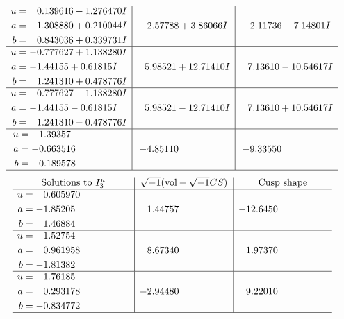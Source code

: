 \documentclass[1p]{elsarticle_modified}
\theoremstyle{definition}
\newcommand{\I}{\sqrt{-1}}
\begin{document}
$$\begin{array}{c|c|c}
\begin{aligned}
u &= \phantom{-}0.139616 - 1.276470 I \\
a &= -1.308880 + 0.210044 I \\
b &= \phantom{-}0.843036 + 0.339731 I\end{aligned}
 & \phantom{-}2.57788 + 3.86066 I & -2.11736 - 7.14801 I \\ \hline\begin{aligned}
u &= -0.777627 + 1.138280 I \\
a &= -1.44155 + 0.61815 I \\
b &= \phantom{-}1.241310 + 0.478776 I\end{aligned}
 & \phantom{-}5.98521 + 12.71410 I & \phantom{-}7.13610 - 10.54617 I \\ \hline\begin{aligned}
u &= -0.777627 - 1.138280 I \\
a &= -1.44155 - 0.61815 I \\
b &= \phantom{-}1.241310 - 0.478776 I\end{aligned}
 & \phantom{-}5.98521 - 12.71410 I & \phantom{-}7.13610 + 10.54617 I \\ \hline\begin{aligned}
u &= \phantom{-}1.39357\phantom{ +0.000000I} \\
a &= -0.663516\phantom{ +0.000000I} \\
b &= \phantom{-}0.189578\phantom{ +0.000000I}\end{aligned}
 & -4.85110\phantom{ +0.000000I} & -9.33550\phantom{ +0.000000I}\\
 \hline 
 \end{array}$$\newpage$$\begin{array}{c|c|c}  
\text{Solutions to }I^u_{3}& \I (\text{vol} + \sqrt{-1}CS) & \text{Cusp shape}\\
 \hline 
\begin{aligned}
u &= \phantom{-}0.605970\phantom{ +0.000000I} \\
a &= -1.85205\phantom{ +0.000000I} \\
b &= \phantom{-}1.46884\phantom{ +0.000000I}\end{aligned}
 & \phantom{-}1.44757\phantom{ +0.000000I} & -12.6450\phantom{ +0.000000I} \\ \hline\begin{aligned}
u &= -1.52754\phantom{ +0.000000I} \\
a &= \phantom{-}0.961958\phantom{ +0.000000I} \\
b &= -1.81382\phantom{ +0.000000I}\end{aligned}
 & \phantom{-}8.67340\phantom{ +0.000000I} & \phantom{-}1.97370\phantom{ +0.000000I} \\ \hline\begin{aligned}
u &= -1.76185\phantom{ +0.000000I} \\
a &= \phantom{-}0.293178\phantom{ +0.000000I} \\
b &= -0.834772\phantom{ +0.000000I}\end{aligned}
 & -2.94480\phantom{ +0.000000I} & \phantom{-}9.22010\phantom{ +0.000000I}\\
 \hline 
 \end{array}$$\newpage\newpage\renewcommand{\arraystretch}{1}
\end{document}
